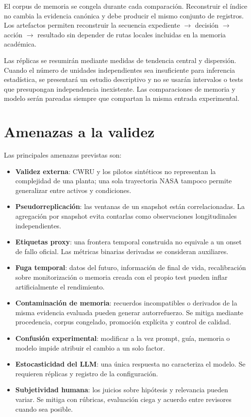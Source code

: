 El corpus de memoria se congela durante cada comparación. Reconstruir el índice
no cambia la evidencia canónica y debe producir el mismo conjunto de registros.
Los artefactos permiten reconstruir la secuencia expediente
\(\rightarrow\) decisión \(\rightarrow\) acción \(\rightarrow\)
resultado sin depender de rutas locales incluidas en la memoria académica.

Las réplicas se resumirán mediante medidas de tendencia central y dispersión.
Cuando el número de unidades independientes sea insuficiente para inferencia
estadística, se presentará un estudio descriptivo y no se usarán intervalos o
tests que presupongan independencia inexistente. Las comparaciones de memoria y
modelo serán pareadas siempre que compartan la misma entrada experimental.

\section{Amenazas a la validez}

Las principales amenazas previstas son:

\begin{itemize}
  \item \textbf{Validez externa}: CWRU y los pilotos sintéticos no representan
        la complejidad de una planta; una sola trayectoria NASA tampoco permite
        generalizar entre activos y condiciones.
  \item \textbf{Pseudorreplicación}: las ventanas de un snapshot están
        correlacionadas. La agregación por snapshot evita contarlas como
        observaciones longitudinales independientes.
  \item \textbf{Etiquetas proxy}: una frontera temporal construida no equivale a
        un onset de fallo oficial. Las métricas binarias derivadas se consideran
        auxiliares.
  \item \textbf{Fuga temporal}: datos del futuro, información de final de vida,
        recalibración sobre monitorización o memoria creada con el propio test
        pueden inflar artificialmente el rendimiento.
  \item \textbf{Contaminación de memoria}: recuerdos incompatibles o derivados
        de la misma evidencia evaluada pueden generar autorrefuerzo. Se mitiga
        mediante procedencia, corpus congelado, promoción explícita y control
        de calidad.
  \item \textbf{Confusión experimental}: modificar a la vez prompt, guía,
        memoria o modelo impide atribuir el cambio a un solo factor.
  \item \textbf{Estocasticidad del LLM}: una única respuesta no caracteriza el
        modelo. Se requieren réplicas y registro de la configuración.
  \item \textbf{Subjetividad humana}: los juicios sobre hipótesis y relevancia
        pueden variar. Se mitiga con rúbricas, evaluación ciega y acuerdo entre
        revisores cuando sea posible.
\end{itemize}

